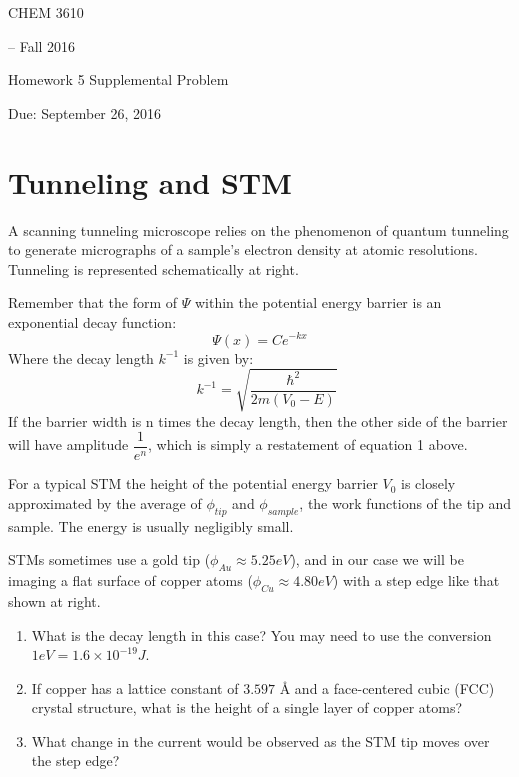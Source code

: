 \documentclass[10pt, letterpaper]{memoir}
\begin{document}
	\begin{center}
		{\Huge CHEM 3610}
		{\LARGE-- Fall 2016
		
		Homework 5 Supplemental Problem
		
		Due: September 26, 2016}
	\end{center}
	
	\begin{minipage}[c]{0.55\textwidth}
		\section*{Tunneling and STM}
		A scanning tunneling microscope relies on the phenomenon of quantum tunneling to generate micrographs of a sample's electron density at atomic resolutions. Tunneling is represented schematically at right.
		
	
		Remember that the form of $\Psi$ within the potential energy barrier is an exponential decay function:
		\begin{equation}
			\Psi(x) = Ce^{-kx}
		\end{equation}
		Where the decay length $k^{-1}$ is given by:
		\begin{equation}
			\hspace{1em}k^{-1}=\sqrt{\frac{\hbar^2}{2m\left(V_0-E\right)}}
		\end{equation}
		If the barrier width is n times the decay length, then the other side of the barrier will have amplitude $\dfrac{1}{e^n}$, which is simply a restatement of equation 1 above.
		
		For a typical STM the height of the potential energy barrier $V_0$ is closely approximated by the average of $\phi_{tip}$ and $\phi_{sample}$, the work functions of the tip and sample. The energy is usually negligibly small.
		
		STMs sometimes use a gold tip ($\phi_{Au}\approx 5.25 eV$), and in our case we will be imaging a flat surface of copper atoms ($\phi_{Cu} \approx 4.80 eV$) with a step edge like that shown at right. 
		
		\begin{enumerate}
			\item What is the decay length in this case? You may need to use the conversion $1eV = 1.6\times 10^{-19} J$.
			\vspace{3em}
			\item If copper has a lattice constant of $3.597$ \r{A} and a face-centered cubic (FCC) crystal structure, what is the height of a single layer of copper atoms?
			\vspace{3em}
			\item What change in the current would be observed as the STM tip moves over the step edge?
		\end{enumerate}		
	\end{minipage}	
\end{document}
